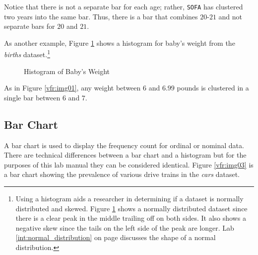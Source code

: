 Notice that there is not a separate bar for each age; rather, \texttt{SOFA} has clustered two years into the same bar. Thus, there is a bar that combines $ 20 $-$ 21 $ and not separate bars for $ 20 $ and $ 21 $.

As another example, Figure \ref{vfr:img02} shows a histogram for baby's weight from the \textit{births} dataset.\footnote{Using a histogram aids a researcher in determining if a dataset is normally distributed and skewed. Figure \ref{vfr:img02} shows a normally distributed dataset since there is a clear peak in the middle trailing off on both sides. It also shows a negative skew since the tails on the left side of the peak are longer. Lab \ref{int:normal_distribution} on page \pageref{int:normal_distribution} discusses the shape of a normal distribution.}

\begin{figure}[H]
  \begin{center}
    \caption{Histogram of Baby's Weight}
    \label{vfr:img02}
  \end{center}
\end{figure}

As in Figure \ref{vfr:img01}, any weight between $ 6 $ and $ 6.99 $ pounds is clustered in a single bar between $ 6 $ and $ 7 $.

\subsection{Bar Chart} A bar chart is used to display the frequency count for ordinal or nominal data. There are technical differences between a bar chart and a histogram but for the purposes of this lab manual they can be considered identical. Figure \ref{vfr:img03} is a bar chart showing the prevalence of various drive trains in the \textit{cars} dataset.

